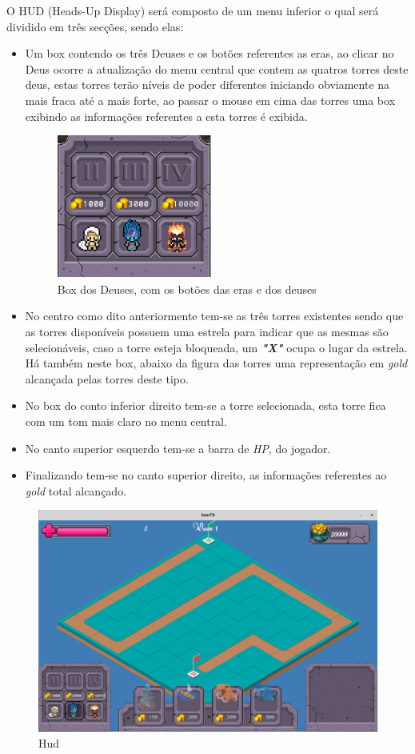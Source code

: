\documentclass[11pt]{article} %
\begin{document}
O HUD (Heads-Up Display) será composto de um menu inferior o qual será dividido em três secções, sendo elas:
\begin{itemize}
\item Um box contendo os três Deuses e os botões referentes as eras, ao clicar no Deus ocorre a atualização do menu central que contem as quatros torres deste deus, estas torres terão níveis de poder diferentes iniciando obviamente na mais fraca até a mais forte, ao passar o mouse em cima das torres uma box exibindo as informações referentes a esta torres é exibida.

\begin{figure}[!htp]
\centering
\includegraphics[scale=1]{res/box_dos_deuses.png}
\caption{Box dos Deuses, com os botões das eras e dos deuses}
\label{HUD}
\end{figure}

\item No centro como dito anteriormente tem-se as três torres existentes sendo que as torres disponíveis possuem uma estrela para indicar que as mesmas são selecionáveis, caso a torre esteja bloqueada, um \textit{\textbf{"X"}} ocupa o lugar da estrela. Há também neste box, abaixo da figura das torres uma representação em \textit{gold} alcançada pelas torres deste tipo.
\item No box do conto inferior direito tem-se a torre selecionada, esta torre fica com um tom mais claro no menu central.
\item No canto superior esquerdo tem-se a barra de \textit{HP}, do jogador.
\item Finalizando tem-se no canto superior direito, as informações referentes ao \textit{gold} total alcançado.
\end{itemize}

\begin{figure}[!htp]
\centering
\includegraphics[scale=0.4]{res/gameplay2.png}
\caption{Hud}
\label{HUD}
\end{figure}
\end{document}
